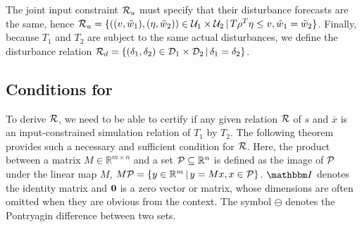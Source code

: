 %
The joint input constraint $\mathcal{R}_{u}$ must specify %
that their disturbance forecasts are the same, %
hence $\mathcal{R}_{u} = \{ ((v, \tilde{w}_{1}), (\eta, \tilde{w}_{2})) \in \mathcal{U}_{1} \times \mathcal{U}_{2} \,|\, T \rho^{T} \eta \leq v, \tilde{w}_{1} = \tilde{w}_{2} \}$.
Finally, because $T_{1}$ and $T_{2}$ are subject to the same actual disturbances, we define the disturbance relation $\mathcal{R}_{d} = \{ (\delta_{1}, \delta_{2}) \in \mathcal{D}_{1} \times \mathcal{D}_{2} \,|\, \delta_{1} = \delta_{2} \}$.

\subsection{Conditions for \RSet} %
\label{sec:abstraction-gs:feedback:conditions}

To derive $\mathcal{R}$, we need to be able to certify if any given relation $\mathcal{R}$ of $s$ and $\overbar{x}$ is an input-constrained simulation relation of $T_{1}$ by $T_{2}$.
The following theorem provides such a necessary and sufficient condition for $\mathcal{R}$.
Here, the product between a matrix $M \in \mathbb{R}^{m \times n}$ and a set $\mathcal{P} \subseteq \mathbb{R}^{n}$ is defined as the image of $\mathcal{P}$ under the linear map $M$, \ie $M \mathcal{P} = \{ y \in \mathbb{R}^{m} \,|\, y = M x, x \in \mathcal{P}\}$.
$\IdentityMatrix$ denotes the identity matrix and $\mathbf{0}$ is a zero vector or matrix, whose dimensions are often omitted when they are obvious from the context.
The symbol $\ominus$ denotes the Pontryagin difference between two sets.

